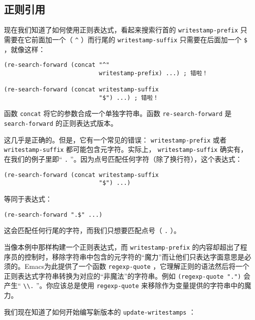 \subsection{正则引用}
\label{section:04-Regexp-Quoting}

现在我们知道了如何使用正则表达式，看起来搜索行首的 \texttt{writestamp-prefix} 只需要在它前面加一个（ \verb|^| ）而行尾的 \texttt{writestamp-suffix} 只需要在后面加一个 \verb|$| ，就像这样：

\begin{verbatim}
(re-search-forward (concat "^"
                           writestamp-prefix) ...) ; 错啦！

(re-search-forward (concat writestamp-suffix
                           "$") ...) ; 错啦！
\end{verbatim}

函数 \texttt{concat} 将它的参数合成一个单独字符串。函数 \texttt{re-search-forward} 是 \texttt{search-forward} 的正则表达式版本。

这几乎是正确的。但是，它有一个常见的错误： \texttt{writestamp-prefix} 或者 \texttt{writestamp-suffix} 都可能包含元字符。实际上， \texttt{writestamp-suffix} 确实有，在我们的例子里即“ \verb|.| ”。因为点号匹配任何字符（除了换行符），这个表达式：

\begin{verbatim}
(re-search-forward (concat writestamp-suffix
                           "$") ...)
\end{verbatim}

等同于表达式：

\begin{verbatim}
(re-search-forward ".$" ...)
\end{verbatim}

这会匹配任何行尾的字符，而我们只想要匹配点号（ \verb|.| ）。

当像本例中那样构建一个正则表达式，而 \texttt{writestamp-prefix} 的内容却超出了程序员的控制时，移除字符串中包含的元字符的“魔力”而让他们只表达字面意思是必须的。Emacs为此提供了一个函数 \texttt{regexp-quote} ，它理解正则的语法然后将一个正则表达式字符串转换为对应的“非魔法”的字符串。例如 \texttt{(regexp-quote ".")} 会产生“ \verb|\\.| ”。你应该总是使用 \texttt{regexp-quote} 来移除作为变量提供的字符串中的魔力。

我们现在知道了如何开始编写新版本的 \texttt{update-writestamps} ：

